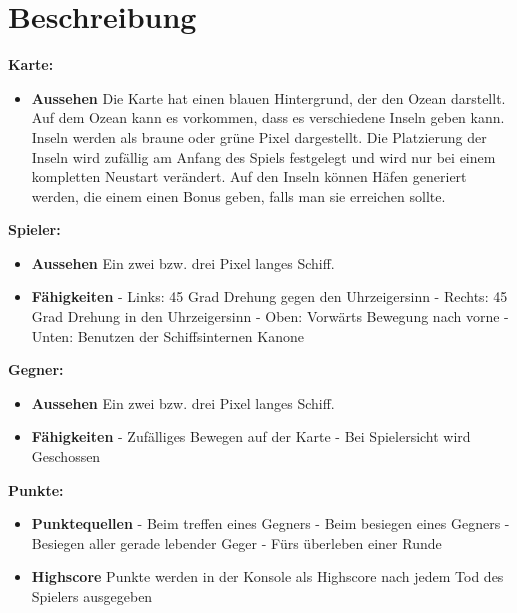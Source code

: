 \documentclass{article}
\begin{document}
\section{Beschreibung}
\textbf{Karte:}
\begin{itemize}
    \item \textbf{Aussehen}
        \newline
        Die Karte hat einen blauen Hintergrund, der den Ozean darstellt. Auf dem Ozean kann es vorkommen, dass es verschiedene Inseln geben kann. Inseln werden als braune oder grüne Pixel dargestellt. Die Platzierung der Inseln wird zufällig am Anfang des Spiels festgelegt und wird nur bei einem kompletten Neustart verändert. Auf den Inseln können Häfen generiert werden, die einem einen Bonus geben, falls man sie erreichen sollte.
\end{itemize}
\textbf{Spieler:}
\begin{itemize}
    \item \textbf{Aussehen}
        \newline
        Ein zwei bzw. drei Pixel langes Schiff.
    \item \textbf{Fähigkeiten}
        \newline - Links: 45 Grad Drehung gegen den Uhrzeigersinn
        \newline - Rechts: 45 Grad Drehung in den Uhrzeigersinn
        \newline - Oben: Vorwärts Bewegung nach vorne
        \newline - Unten: Benutzen der Schiffsinternen Kanone
\end{itemize}
\textbf{Gegner:}
\begin{itemize}
    \item \textbf{Aussehen}
        \newline
        Ein zwei bzw. drei Pixel langes Schiff.
    \item \textbf{Fähigkeiten}
        \newline - Zufälliges Bewegen auf der Karte
        \newline - Bei Spielersicht wird Geschossen
\end{itemize}
\textbf{Punkte:}
\begin{itemize}
    \item \textbf{Punktequellen}
        \newline - Beim treffen eines Gegners
        \newline - Beim besiegen eines Gegners
        \newline - Besiegen aller gerade lebender Geger
        \newline - Fürs überleben einer Runde
    \item \textbf{Highscore}
        \newline
        Punkte werden in der Konsole als Highscore nach jedem Tod des Spielers ausgegeben
\end{itemize}
\newpage
\end{document}
